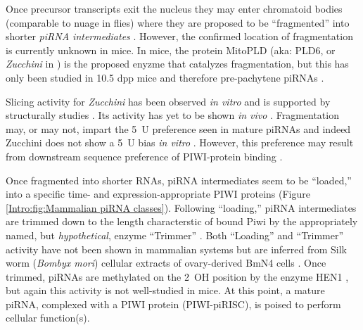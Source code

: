 {    Once precursor transcripts exit the nucleus they may enter chromatoid bodies (comparable to nuage in flies) \citep{Lim2007,Meikar2011,Zhang2012,Meikar2014} where they are proposed to be ``fragmented'' into shorter \textit{piRNA intermediates} \citep{Saito2010,Li2013}. However, the confirmed location of fragmentation is currently unknown in mice. In mice, the protein MitoPLD (aka: PLD6, or \textit{Zucchini} in \flies{}) is the proposed enyzme that catalyzes fragmentation, but this has only been studied in 10.5 dpp mice and therefore pre-pachytene piRNAs \citep{Watanabe2011a}.

    Slicing activity for \textit{Zucchini} has been observed \textit{in vitro} and is supported by structurally studies \citep{Nishimasu2012,Ipsaro2012}. Its activity has yet to be shown \textit{in vivo} \citep{Luteijn2013}. Fragmentation may, or may not, impart the 5\textprime~U preference seen in mature piRNAs \citep{Gunawardane2007,Brennecke2007} and indeed Zucchini does not show a 5\textprime~U bias \textit{in vitro} \citep{Nishimasu2012,Ipsaro2012}. However, this preference may result from downstream sequence preference of PIWI-protein binding \citep{Cora2014}.

    Once fragmented into shorter RNAs, piRNA intermediates seem to be ``loaded,'' into a specific time- and expression-appropriate PIWI proteins (Figure \ref{Intro:fig:Mammalian piRNA classes}). Following ``loading,'' piRNA intermediates are trimmed down to the length characterstic of bound Piwi by the appropriately named, but \textit{hypothetical}, enzyme ``Trimmer'' \citep{Li2013}. Both ``Loading'' and ``Trimmer'' activity have not been shown in mammalian systems but are inferred from Silk worm (\textit{Bombyx mori}) cellular extracts of ovary-derived BmN4 cells \citep{Kawaoka2009}. Once trimmed, piRNAs are methylated on the 2\textprime~OH position by the enzyme HEN1 \citep{Horwich2007,Kirino2007,Ohara2007,Kawaoka2011}, but again this activity is not well-studied in mice. At this point, a mature piRNA, complexed with a PIWI protein (PIWI-piRISC), is poised to perform cellular function(s).

}
